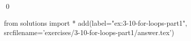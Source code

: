 
\begin{ex}
  \label{ex:3-10-for-loops-part1}
  
  \qed
\end{ex}
\begin{python0}
from solutions import *
add(label="ex:3-10-for-loops-part1",
    srcfilename='exercises/3-10-for-loops-part1/answer.tex')
\end{python0}
